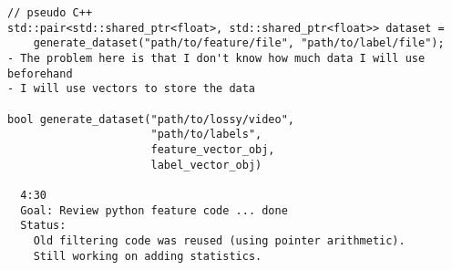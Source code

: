 \documentclass[12pt,oneside]{book}
\begin{document}
\begin{lstlisting}
// pseudo C++
std::pair<std::shared_ptr<float>, std::shared_ptr<float>> dataset = 
    generate_dataset("path/to/feature/file", "path/to/label/file");
- The problem here is that I don't know how much data I will use beforehand
- I will use vectors to store the data

bool generate_dataset("path/to/lossy/video",
                      "path/to/labels",
                      feature_vector_obj,
                      label_vector_obj)

  4:30
  Goal: Review python feature code ... done
  Status:
    Old filtering code was reused (using pointer arithmetic).
    Still working on adding statistics.
\end{lstlisting}

  \printbibliography[title={Bibliografía},heading=bibintoc]
\end{document}

